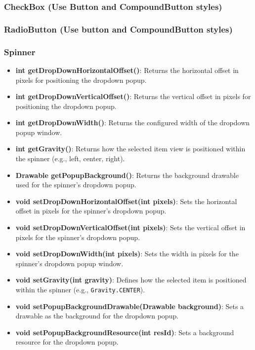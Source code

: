 \documentclass{report}
\begin{document}
\begin{itemize}
    \pagebreak 
    \subsubsection{CheckBox (Use Button and CompoundButton styles)}

    \pagebreak 
    \subsubsection{RadioButton (Use button and CompoundButton styles)}

    \pagebreak 
    \subsubsection{Spinner}
    \begin{itemize}
        \item \textbf{int getDropDownHorizontalOffset()}: Returns the horizontal offset in pixels for positioning the dropdown popup.
        \item \textbf{int getDropDownVerticalOffset()}: Returns the vertical offset in pixels for positioning the dropdown popup.
        \item \textbf{int getDropDownWidth()}: Returns the configured width of the dropdown popup window.
        \item \textbf{int getGravity()}: Returns how the selected item view is positioned within the spinner (e.g., left, center, right).
        \item \textbf{Drawable getPopupBackground()}: Returns the background drawable used for the spinner’s dropdown popup.
        \item \textbf{void setDropDownHorizontalOffset(int pixels)}: Sets the horizontal offset in pixels for the spinner’s dropdown popup.
        \item \textbf{void setDropDownVerticalOffset(int pixels)}: Sets the vertical offset in pixels for the spinner’s dropdown popup.
        \item \textbf{void setDropDownWidth(int pixels)}: Sets the width in pixels for the spinner’s dropdown popup window.
        \item \textbf{void setGravity(int gravity)}: Defines how the selected item is positioned within the spinner (e.g., \texttt{Gravity.CENTER}).
        \item \textbf{void setPopupBackgroundDrawable(Drawable background)}: Sets a drawable as the background for the dropdown popup.
        \item \textbf{void setPopupBackgroundResource(int resId)}: Sets a background resource for the dropdown popup.

\end{itemize}
\end{itemize}
\end{document}
